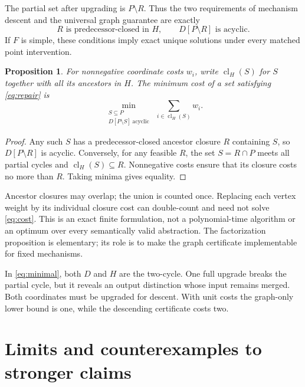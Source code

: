 \documentclass[11pt,a4paper]{article}
\newtheorem{proposition}[theorem]{Proposition}
\theoremstyle{definition}
\theoremstyle{remark}
\DeclareMathOperator{\cl}{cl}
\begin{document}
The partial set after upgrading is $P\setminus R$. Thus the two requirements of mechanism descent and the universal graph guarantee are exactly
\begin{equation}\label{eq:repair}
 R\text{ is predecessor-closed in }H,
 \qquad D[P\setminus R]\text{ is acyclic}.
\end{equation}
If $F$ is simple, these conditions imply exact unique solutions under every matched point intervention.

\begin{proposition}\label{prop:cost}
For nonnegative coordinate costs $w_i$, write $\cl_H(S)$ for $S$ together with all its ancestors in $H$. The minimum cost of a set satisfying \eqref{eq:repair} is
\begin{equation}\label{eq:cost}
 \min_{\substack{S\subseteq P\\D[P\setminus S]\ \mathrm{acyclic}}}
 \ \sum_{i\in\cl_H(S)}w_i.
\end{equation}
\end{proposition}
\begin{proof}
Any such $S$ has a predecessor-closed ancestor closure $R$ containing $S$, so $D[P\setminus R]$ is acyclic. Conversely, for any feasible $R$, the set $S=R\cap P$ meets all partial cycles and $\cl_H(S)\subseteq R$. Nonnegative costs ensure that its closure costs no more than $R$. Taking minima gives equality.
\end{proof}

Ancestor closures may overlap; the union is counted once. Replacing each vertex weight by its individual closure cost can double-count and need not solve \eqref{eq:cost}. This is an exact finite formulation, not a polynomial-time algorithm or an optimum over every semantically valid abstraction. The factorization proposition is elementary; its role is to make the graph certificate implementable for fixed mechanisms.

In \eqref{eq:minimal}, both $D$ and $H$ are the two-cycle. One full upgrade breaks the partial cycle, but it reveals an output distinction whose input remains merged. Both coordinates must be upgraded for descent. With unit costs the graph-only lower bound is one, while the descending certificate costs two.

\section{Limits and counterexamples to stronger claims}
\end{document}
